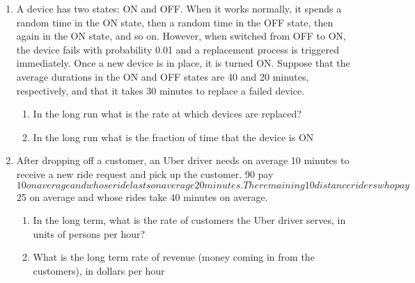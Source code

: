 \documentclass{article} %
\theoremstyle{plain}
\theoremstyle{case}
\begin{document}
\begin{enumerate}[label={\fbox{\textbf{Exercise \#\arabic* :}}}]
  \newpage
  \item A device has two states: ON and OFF. When it works normally, it spends a random time in the
ON state, then a random time in the OFF state, then again in the ON state, and so on. However,
when switched from OFF to ON, the device fails with probability 0.01 and a replacement process
is triggered immediately. Once a new device is in place, it is turned ON. Suppose that the average
durations in the ON and OFF states are 40 and 20 minutes, respectively, and that it takes 30
minutes to replace a failed device.
    \begin{enumerate}
      \item In the long run what is the rate at which devices are replaced?
      \item In the long run what is the fraction of time that the device is ON
    \end{enumerate}
  \newpage
  \item After dropping off a customer, an Uber driver needs on average 10 minutes to receive a new
ride request and pick up the customer. 90%
pay $10 on average and whose ride lasts on average 20 minutes. The remaining 10%
distance riders who pay $25 on average and whose rides take 40 minutes on average.
    \begin{enumerate}
      \item In the long term, what is the rate of customers the Uber driver serves, in units of persons per hour?
      \item What is the long term rate of revenue (money coming in from the customers), in dollars per hour
    \end{enumerate}


\end{enumerate}
\end{document}
